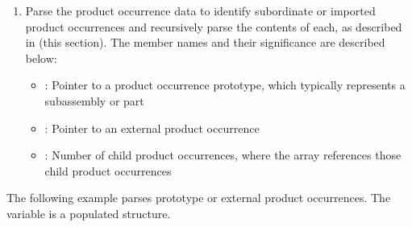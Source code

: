 \documentclass[letterpaper,12pt,english,openany,oneside]{sphinxmanual}
\begin{document}
\begin{sphinxVerbatim}[commandchars=\\\{\}]
   
\end{sphinxVerbatim}
\begin{enumerate}
%
\setcounter{enumi}{4}
\item {} 
Parse the product occurrence data to identify subordinate or imported product occurrences and recursively parse the contents of each, as described in  (this section). The member names and their significance are described below:
\begin{itemize}
\item {} 
 : Pointer to a product occurrence prototype, which typically represents a subassembly or part

\item {} 
 : Pointer to an external product occurrence

\item {} 
 : Number of child product occurrences, where the  array references those child product occurrences

\end{itemize}

\end{enumerate}

The following example parses prototype or external product occurrences. The  variable is a populated  structure.

\begin{sphinxVerbatim}[commandchars=\\\{\}]
  
   
  
   
\end{sphinxVerbatim}
\end{document}
